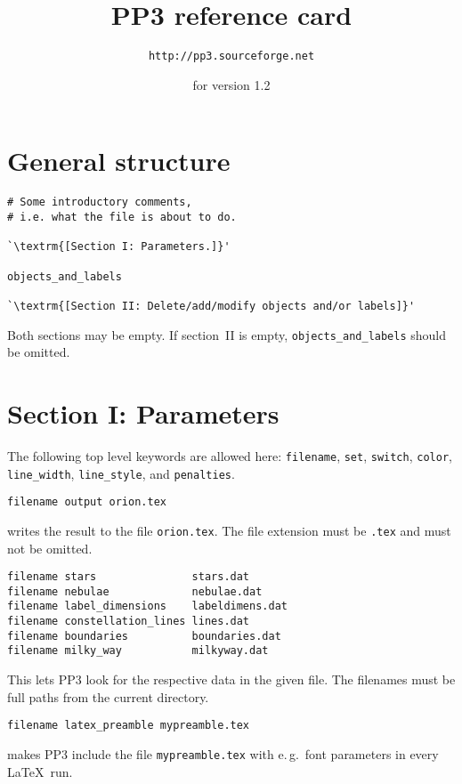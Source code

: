 \documentclass{article}
\newcommand{\subskip}{\vspace{\subskipamount}\pagebreak[3]}
\begin{document}
\raggedright\small\setlength{\columnsep}{1.5cm}
\pagestyle{empty}\thispagestyle{empty}

\begin{multicols*}{3}
\title{PP3 reference card}
\author{\texttt{http://pp3.sourceforge.net}}
\date{for version 1.2}
  \maketitle
\section{General structure}

\begin{lstlisting}
# Some introductory comments,
# i.e. what the file is about to do.

`\textrm{[Section I: Parameters.]}'

objects_and_labels

`\textrm{[Section II: Delete/add/modify objects and/or labels]}'
\end{lstlisting}
Both sections may be empty.  If section~II is empty,
\lstinline{objects_and_labels} should be omitted.


\section{Section I: Parameters}

The following top level keywords are allowed here: \lstinline{filename},
\lstinline{set}, \lstinline{switch}, \lstinline{color}, \lstinline{line_width},
\lstinline{line_style}, and \lstinline{penalties}.\subskip

\begin{lstlisting}
filename output orion.tex
\end{lstlisting}
writes the result to the file \verb|orion.tex|.  The file extension must be
\verb|.tex| and must not be omitted.

\begin{lstlisting}
filename stars               stars.dat
filename nebulae             nebulae.dat
filename label_dimensions    labeldimens.dat
filename constellation_lines lines.dat
filename boundaries          boundaries.dat
filename milky_way           milkyway.dat
\end{lstlisting}
This lets PP3 look for the respective data in the given file.  The
filenames must be full paths from the current directory.

\begin{lstlisting}
filename latex_preamble mypreamble.tex
\end{lstlisting}
makes PP3 include the file \verb|mypreamble.tex| with e.\,g.\ font
parameters in every \LaTeX\ run.


\end{multicols*}
\end{document}
